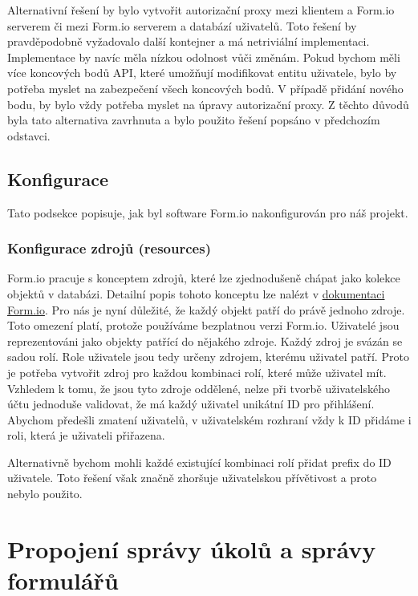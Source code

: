 Alternativní řešení by bylo vytvořit autorizační proxy mezi klientem a Form.io serverem či mezi Form.io serverem a databází uživatelů.
Toto řešení by pravděpodobně vyžadovalo další kontejner a má netriviální implementaci.
Implementace by navíc měla nízkou odolnost vůči změnám.
Pokud bychom měli více koncových bodů API, které umožňují modifikovat entitu uživatele, bylo by potřeba myslet na zabezpečení všech koncových bodů.
V případě přidání nového bodu, by bylo vždy potřeba myslet na úpravy autorizační proxy.
Z těchto důvodů byla tato alternativa zavrhnuta a bylo použito řešení popsáno v předchozím odstavci.

\subsection{Konfigurace}\label{subsec:konfigurace}

Tato podsekce popisuje, jak byl software Form.io nakonfigurován pro náš projekt.

\subsubsection{Konfigurace zdrojů (resources)}\label{subsubsec:konfigurace-resources}

Form.io pracuje s konceptem zdrojů, které lze zjednodušeně chápat jako kolekce objektů v databázi.
Detailní popis tohoto konceptu lze nalézt v \href{https://help.form.io/userguide/resources}{dokumentaci Form.io}.
Pro nás je nyní důležité, že každý objekt patří do právě jednoho zdroje.
Toto omezení platí, protože používáme bezplatnou verzi Form.io.
Uživatelé jsou reprezentováni jako objekty patřící do nějakého zdroje.
Každý zdroj je svázán se sadou rolí.
Role uživatele jsou tedy určeny zdrojem, kterému uživatel patří.
Proto je potřeba vytvořit zdroj pro každou kombinaci rolí, které může uživatel mít.
Vzhledem k tomu, že jsou tyto zdroje oddělené, nelze při tvorbě uživatelského účtu jednoduše validovat, že má každý uživatel unikátní ID pro přihlášení.
Abychom předešli zmatení uživatelů, v uživatelském rozhraní vždy k ID přidáme i roli, která je uživateli přiřazena.

Alternativně bychom mohli každé existující kombinaci rolí přidat prefix do ID uživatele.
Toto řešení však značně zhoršuje uživatelskou přívětivost a proto nebylo použito.


\section{Propojení správy úkolů a správy formulářů}\label{sec:propojeni-spravy-ukolu-a-spravy-formularu}


